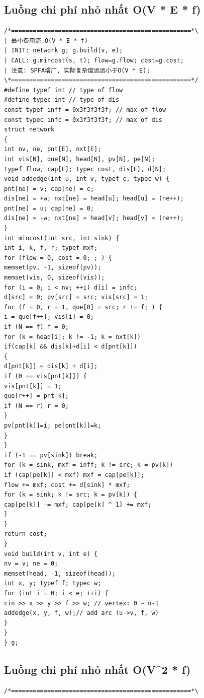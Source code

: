 \documentclass[11pt]{article}
\begin{document}
\subsection{Luồng chi phí nhỏ nhất O(V * E * f)}

\begingroup
\scriptsize
\begin{verbatim}
/*==================================================*\
| 最小费用流 O(V * E * f)
| INIT: network g; g.build(v, e);
| CALL: g.mincost(s, t); flow=g.flow; cost=g.cost;
| 注意: SPFA增广, 实际复杂度远远小于O(V * E);
\*==================================================*/
#define typef int // type of flow
#define typec int // type of dis
const typef inff = 0x3f3f3f3f; // max of flow
const typec infc = 0x3f3f3f3f; // max of dis
struct network
{
int nv, ne, pnt[E], nxt[E];
int vis[N], que[N], head[N], pv[N], pe[N];
typef flow, cap[E]; typec cost, dis[E], d[N];
void addedge(int u, int v, typef c, typec w) {
pnt[ne] = v; cap[ne] = c;
dis[ne] = +w; nxt[ne] = head[u]; head[u] = (ne++);
pnt[ne] = u; cap[ne] = 0;
dis[ne] = -w; nxt[ne] = head[v]; head[v] = (ne++);
}
int mincost(int src, int sink) {
int i, k, f, r; typef mxf;
for (flow = 0, cost = 0; ; ) {
memset(pv, -1, sizeof(pv));
memset(vis, 0, sizeof(vis));
for (i = 0; i < nv; ++i) d[i] = infc;
d[src] = 0; pv[src] = src; vis[src] = 1;
for (f = 0, r = 1, que[0] = src; r != f; ) {
i = que[f++]; vis[i] = 0;
if (N == f) f = 0;
for (k = head[i]; k != -1; k = nxt[k])
if(cap[k] && dis[k]+d[i] < d[pnt[k]])
{
d[pnt[k]] = dis[k] + d[i];
if (0 == vis[pnt[k]]) {
vis[pnt[k]] = 1;
que[r++] = pnt[k];
if (N == r) r = 0;
}
pv[pnt[k]]=i; pe[pnt[k]]=k;
}
}
if (-1 == pv[sink]) break;
for (k = sink, mxf = inff; k != src; k = pv[k])
if (cap[pe[k]] < mxf) mxf = cap[pe[k]];
flow += mxf; cost += d[sink] * mxf;
for (k = sink; k != src; k = pv[k]) {
cap[pe[k]] -= mxf; cap[pe[k] ^ 1] += mxf;
}
}
return cost;
}
void build(int v, int e) {
nv = v; ne = 0;
memset(head, -1, sizeof(head));
int x, y; typef f; typec w;
for (int i = 0; i < e; ++i) {
cin >> x >> y >> f >> w; // vertex: 0 ~ n-1
addedge(x, y, f, w);// add arc (u->v, f, w)
}
}
} g;
\end{verbatim}
\endgroup

\subsection{Luồng chi phí nhỏ nhất O(V\textasciicircum{}2 * f)}

\begingroup
\scriptsize
\begin{verbatim}
/*==================================================*\
\end{verbatim}
\endgroup
\end{document}

